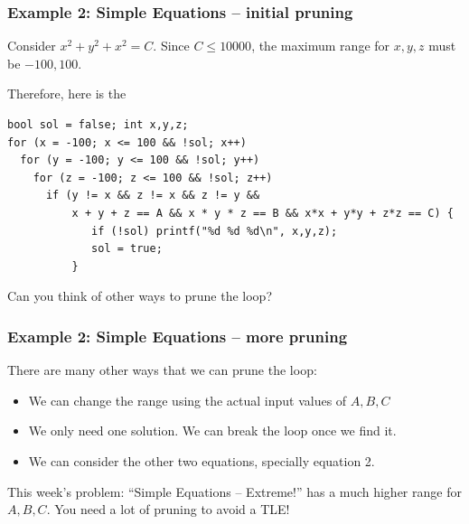 \documentclass{beamer}
\begin{document}

\begin{frame}
  \frametitle{Example 2: Simple Equations -- initial pruning}

  \begin{block}{}
    Consider $x^2 + y^2 + x^2 = C$. Since $C \leq 10000$, the maximum
    range for $x,y,z$ must be $-100, 100$.
    
    \bigskip

    Therefore, here is the     
  \end{block}

{\smaller
\begin{verbatim}
bool sol = false; int x,y,z;
for (x = -100; x <= 100 && !sol; x++)
  for (y = -100; y <= 100 && !sol; y++)
    for (z = -100; z <= 100 && !sol; z++)
      if (y != x && z != x && z != y &&
          x + y + z == A && x * y * z == B && x*x + y*y + z*z == C) {
             if (!sol) printf("%d %d %d\n", x,y,z);
             sol = true;
          }
\end{verbatim}

\begin{block}{}
  Can you think of other ways to prune the loop?

  
\end{block}
}
\end{frame}

\begin{frame}
  \frametitle{Example 2: Simple Equations -- more pruning}
  There are many other ways that we can prune the loop:

  \medskip

  \begin{itemize}
  \item We can change the range using the actual input values of $A,B,C$
  \item We only need one solution. We can break the loop once we find it.
  \item We can consider the other two equations, specially equation 2.
  \end{itemize}

  \vfill

  \begin{alertblock}{}
    This week's problem: ``Simple Equations -- Extreme!'' has a much
    higher range for $A,B,C$. You need a lot of pruning to avoid a TLE!
  \end{alertblock}
\end{frame}
\end{document}
